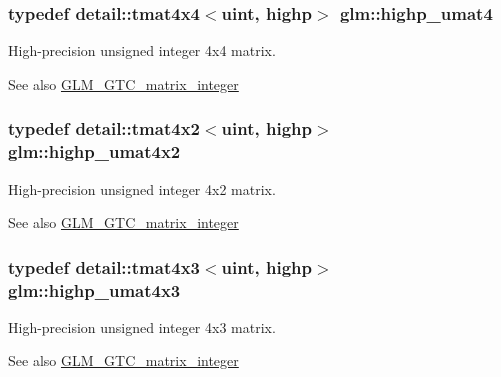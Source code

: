 \subsubsection[{\texorpdfstring{highp\+\_\+umat4}{highp_umat4}}]{\setlength{\rightskip}{0pt plus 5cm}typedef detail\+::tmat4x4$<$uint, highp$>$ {\bf glm\+::highp\+\_\+umat4}}\hypertarget{group__gtc__matrix__integer_gaf12f0d2744e809e64469d27ef392aa98}{}\label{group__gtc__matrix__integer_gaf12f0d2744e809e64469d27ef392aa98}
High-\/precision unsigned integer 4x4 matrix. \begin{DoxySeeAlso}{See also}
\hyperlink{group__gtc__matrix__integer}{G\+L\+M\+\_\+\+G\+T\+C\+\_\+matrix\+\_\+integer} 
\end{DoxySeeAlso}
\subsubsection[{\texorpdfstring{highp\+\_\+umat4x2}{highp_umat4x2}}]{\setlength{\rightskip}{0pt plus 5cm}typedef detail\+::tmat4x2$<$uint, highp$>$ {\bf glm\+::highp\+\_\+umat4x2}}\hypertarget{group__gtc__matrix__integer_ga32442efcb778cb80024a17bafa781f81}{}\label{group__gtc__matrix__integer_ga32442efcb778cb80024a17bafa781f81}
High-\/precision unsigned integer 4x2 matrix. \begin{DoxySeeAlso}{See also}
\hyperlink{group__gtc__matrix__integer}{G\+L\+M\+\_\+\+G\+T\+C\+\_\+matrix\+\_\+integer} 
\end{DoxySeeAlso}
\subsubsection[{\texorpdfstring{highp\+\_\+umat4x3}{highp_umat4x3}}]{\setlength{\rightskip}{0pt plus 5cm}typedef detail\+::tmat4x3$<$uint, highp$>$ {\bf glm\+::highp\+\_\+umat4x3}}\hypertarget{group__gtc__matrix__integer_ga763a36c57b6073ca3cac739bfbe794ba}{}\label{group__gtc__matrix__integer_ga763a36c57b6073ca3cac739bfbe794ba}
High-\/precision unsigned integer 4x3 matrix. \begin{DoxySeeAlso}{See also}
\hyperlink{group__gtc__matrix__integer}{G\+L\+M\+\_\+\+G\+T\+C\+\_\+matrix\+\_\+integer} 
\end{DoxySeeAlso}
